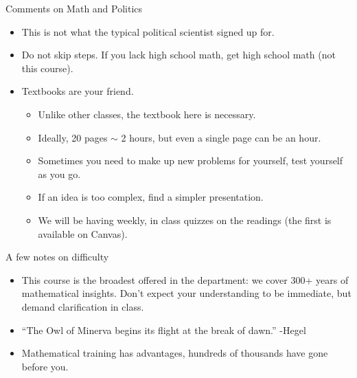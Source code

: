 \documentclass[aspectratio=169, handout]{beamer}
\numberwithin{equation}{section}
\begin{document}
\begin{frame}{Comments on Math and Politics}
\begin{itemize}
\item This is not what the typical political scientist signed up for.\pause
\item Do not skip steps.  If you lack high school math, get high school math (not this course).\pause
\item Textbooks are your friend.  
\begin{itemize}
\item Unlike other classes, the textbook here is necessary.
\item Ideally, 20 pages $\sim$ 2 hours, but even a single page can be an hour.
\item Sometimes you need to make up new problems for yourself, test yourself as you go.
\item If an idea is too complex, find a simpler presentation.
\item We will be having weekly, in class quizzes on the readings (the first is available on Canvas).
\end{itemize}
\end{itemize}


\end{frame}


\begin{frame}{A few notes on difficulty}

\begin{itemize}

\item This course is the broadest offered in the department: we cover 300+ years of mathematical insights. \pause Don't expect your understanding to be immediate, but demand clarification in class.\pause
\item ``The Owl of Minerva begins its flight at the break of dawn.'' -Hegel \pause
\item Mathematical training has advantages, hundreds of thousands have gone before you.  

\end{itemize}

\end{frame}
\end{document}
